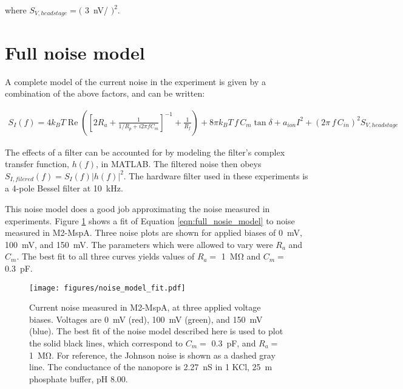 \noindent
where $S_{V,headstage} = ($ \SI{3}{\nV/\sqrt{\Hz}} $)^2$.

\section{Full noise model}
\label{sec:full_noise_model}

A complete model of the current noise in the experiment is given by a combination of the above factors, and can be written:

\begin{multline}
S_I(f) = 4 k_B T \operatorname{Re} \left( \left[ 2 R_a + \frac{1}{ 1/R_p + i 2 \pi f C_m } \right]^{-1} + \frac{1}{R_f} \right) + 8 \pi k_B T \, f \, C_m \tan \delta + a_{ion} I^2 + (2 \pi \, f \, C_{in})^2 S_{V,headstage}
\label{eqn:full_nosie_model}
\end{multline}

The effects of a filter can be accounted for by modeling the filter's complex transfer function, $h(f)$, in MATLAB.  The filtered noise then obeys $S_{I,filered}(f) = S_I(f) |h(f)|^2$.  The hardware filter used in these experiments is a 4-pole Bessel filter at \SI{10}{\kHz}.

This noise model does a good job approximating the noise measured in experiments.  Figure \ref{fig:noise_model_fit} shows a fit of Equation \ref{eqn:full_nosie_model} to noise measured in M2-MspA.  Three noise plots are shown for applied biases of \SI{0}{\mV}, \SI{100}{\mV}, and \SI{150}{\mV}.  The parameters which were allowed to vary were $R_a$ and $C_m$.  The best fit to all three curves yields values of $R_a = $ \SI{1}{\mega\ohm} and $C_m = $ \SI{0.3}{\pF}.

\begin{figure}[h]
\begin{centering}
\texttt{[image: figures/noise\_model\_fit.pdf]}
\caption[Current noise in MspA fit to a model]{Current noise measured in M2-MspA, at three applied voltage biases.  Voltages are \SI{0}{\mV} (red), \SI{100}{\mV} (green), and \SI{150}{\mV} (blue).  The best fit of the noise model described here is used to plot the solid black lines, which correspond to $C_m = $ \SI{0.3}{\pF}, and $R_a = $ \SI{1}{\mega\ohm}.  For reference, the Johnson noise is shown as a dashed gray line.  The conductance of the nanopore is \SI{2.27}{\nano\siemens} in \SI{1}{\Molar} KCl, \SI{25}{\m\Molar} phosphate buffer, pH \num{8.00}.}
\label{fig:noise_model_fit}
\end{centering}
\end{figure}

